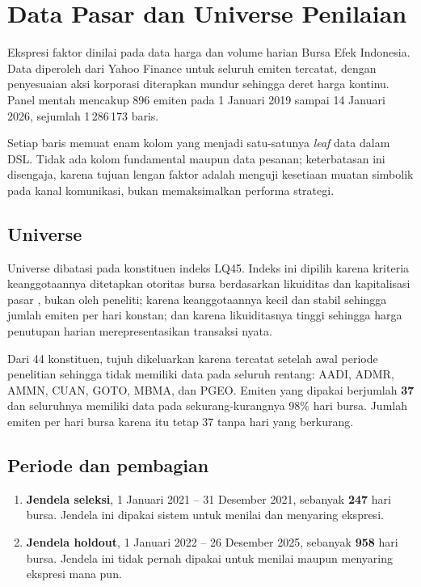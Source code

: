 \documentclass{laporanta1statugm}
\begin{document}
\section{Data Pasar dan Universe Penilaian}
\label{sec:data}

Ekspresi faktor dinilai pada data harga dan volume harian Bursa Efek Indonesia.
Data diperoleh dari Yahoo Finance untuk seluruh emiten tercatat, dengan
penyesuaian aksi korporasi diterapkan mundur sehingga deret harga kontinu.
Panel mentah mencakup 896 emiten pada 1 Januari 2019 sampai 14 Januari 2026,
sejumlah 1\,286\,173 baris.

Setiap baris memuat enam kolom yang menjadi satu-satunya \textit{leaf} data
dalam DSL. Tidak ada kolom fundamental maupun data pesanan; keterbatasan ini
disengaja, karena tujuan lengan faktor adalah menguji kesetiaan muatan simbolik
pada kanal komunikasi, bukan memaksimalkan performa strategi.

\subsection{Universe}

Universe dibatasi pada konstituen indeks LQ45. Indeks ini dipilih karena
kriteria keanggotaannya ditetapkan otoritas bursa berdasarkan likuiditas dan
kapitalisasi pasar \citep{tandelilin}, bukan oleh peneliti; karena
keanggotaannya kecil dan stabil sehingga jumlah emiten per hari konstan; dan
karena likuiditasnya tinggi sehingga harga penutupan harian merepresentasikan
transaksi nyata.

Dari 44 konstituen, tujuh dikeluarkan karena tercatat setelah awal periode
penelitian sehingga tidak memiliki data pada seluruh rentang: AADI, ADMR, AMMN,
CUAN, GOTO, MBMA, dan PGEO. Emiten yang dipakai berjumlah \textbf{37} dan
seluruhnya memiliki data pada sekurang-kurangnya 98\% hari bursa. Jumlah emiten
per hari bursa karena itu tetap 37 tanpa hari yang berkurang.

\subsection{Periode dan pembagian}

\begin{enumerate}
  \item \textbf{Jendela seleksi}, 1 Januari 2021 -- 31 Desember 2021, sebanyak
        \textbf{247} hari bursa. Jendela ini dipakai sistem untuk menilai dan
        menyaring ekspresi.
  \item \textbf{Jendela holdout}, 1 Januari 2022 -- 26 Desember 2025, sebanyak
        \textbf{958} hari bursa. Jendela ini tidak pernah dipakai untuk menilai
        maupun menyaring ekspresi mana pun.
\end{enumerate}
\end{document}
